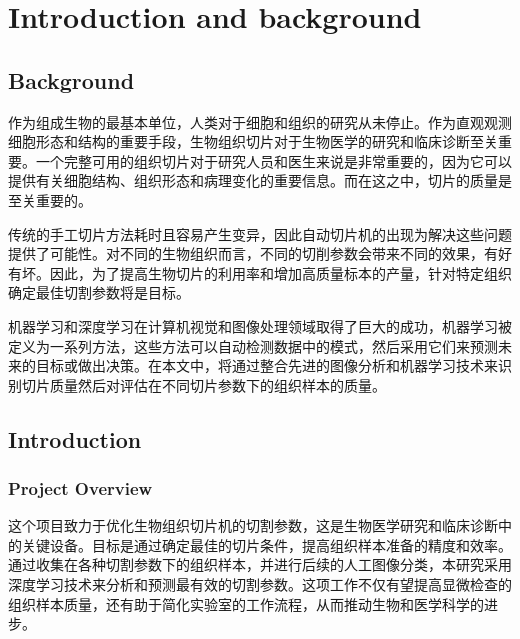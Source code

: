 \section{Introduction and background}
\label{sec:introduction}

\subsection{Background}

作为组成生物的最基本单位，人类对于细胞和组织的研究从未停止。作为直观观测细胞形态和结构的重要手段，生物组织切片对于生物医学的研究和临床诊断至关重要。一个完整可用的组织切片对于研究人员和医生来说是非常重要的，因为它可以提供有关细胞结构、组织形态和病理变化的重要信息。而在这之中，切片的质量是至关重要的。

传统的手工切片方法耗时且容易产生变异，因此自动切片机的出现为解决这些问题提供了可能性。对不同的生物组织而言，不同的切削参数会带来不同的效果，有好有坏。因此，为了提高生物切片的利用率和增加高质量标本的产量，针对特定组织确定最佳切割参数将是目标。

机器学习和深度学习在计算机视觉和图像处理领域取得了巨大的成功，机器学习被定义为一系列方法，这些方法可以自动检测数据中的模式，然后采用它们来预测未来的目标或做出决策\cite{1.1}。在本文中，将通过整合先进的图像分析和机器学习技术来识别切片质量然后对评估在不同切片参数下的组织样本的质量。


\subsection{Introduction}

\subsubsection{Project Overview}

这个项目致力于优化生物组织切片机的切割参数，这是生物医学研究和临床诊断中的关键设备。目标是通过确定最佳的切片条件，提高组织样本准备的精度和效率。通过收集在各种切割参数下的组织样本，并进行后续的人工图像分类，本研究采用深度学习技术来分析和预测最有效的切割参数。这项工作不仅有望提高显微检查的组织样本质量，还有助于简化实验室的工作流程，从而推动生物和医学科学的进步。


